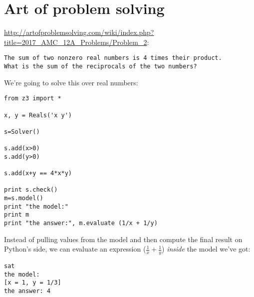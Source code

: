 \section{Art of problem solving}

\url{http://artofproblemsolving.com/wiki/index.php?title=2017_AMC_12A_Problems/Problem_2}:

\begin{lstlisting}
The sum of two nonzero real numbers is 4 times their product.
What is the sum of the reciprocals of the two numbers? 
\end{lstlisting}

We're going to solve this over real numbers:

\begin{lstlisting}[style=custompy]
from z3 import *

x, y = Reals('x y')

s=Solver()

s.add(x>0)
s.add(y>0)

s.add(x+y == 4*x*y)

print s.check()
m=s.model()
print "the model:"
print m
print "the answer:", m.evaluate (1/x + 1/y)
\end{lstlisting}

Instead of pulling values from the model and then compute the final result on Python's side, we can evaluate
an expression ($\frac{1}{x} + \frac{1}{y}$) \textit{inside} the model we've got:

\begin{lstlisting}
sat
the model:
[x = 1, y = 1/3]
the answer: 4
\end{lstlisting}

